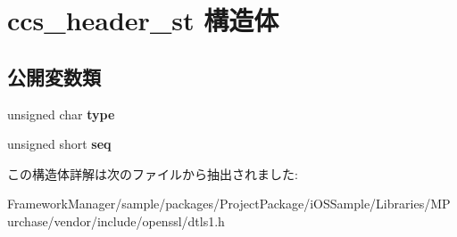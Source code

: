 \hypertarget{structccs__header__st}{}\section{ccs\+\_\+header\+\_\+st 構造体}
\label{structccs__header__st}
\subsection*{公開変数類}
\begin{DoxyCompactItemize}
\item 
\hypertarget{structccs__header__st_a9dc6e844d9a62957f26d52d475a1f7cb}{}unsigned char {\bfseries type}\label{structccs__header__st_a9dc6e844d9a62957f26d52d475a1f7cb}

\item 
\hypertarget{structccs__header__st_a08082f09ae8c97f2e5096ec64ba20cb3}{}unsigned short {\bfseries seq}\label{structccs__header__st_a08082f09ae8c97f2e5096ec64ba20cb3}

\end{DoxyCompactItemize}


この構造体詳解は次のファイルから抽出されました\+:\begin{DoxyCompactItemize}
\item 
Framework\+Manager/sample/packages/\+Project\+Package/i\+O\+S\+Sample/\+Libraries/\+M\+Purchase/vendor/include/openssl/dtls1.\+h\end{DoxyCompactItemize}

